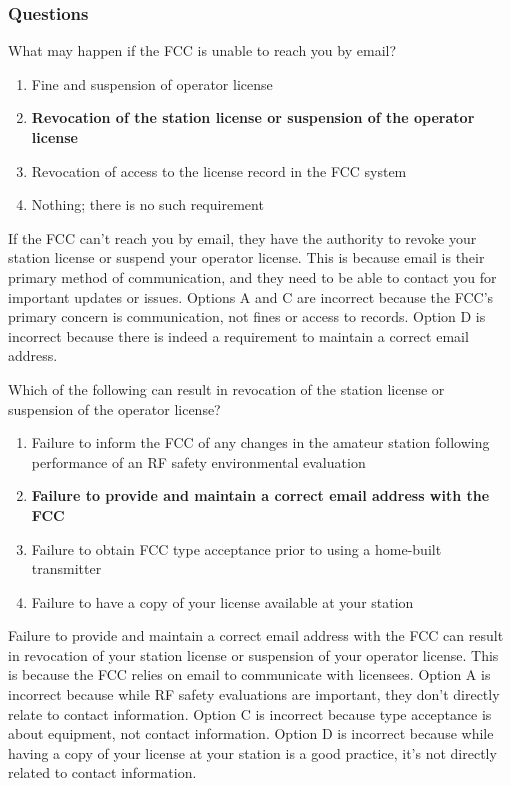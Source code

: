 \subsubsection*{Questions}

\begin{tcolorbox}[colback=gray!10!white,colframe=black!75!black,title={T1C04}]
What may happen if the FCC is unable to reach you by email?
\begin{enumerate}[label=\Alph*),noitemsep]
    \item Fine and suspension of operator license
    \item \textbf{Revocation of the station license or suspension of the operator license}
    \item Revocation of access to the license record in the FCC system
    \item Nothing; there is no such requirement
\end{enumerate}
\end{tcolorbox}

If the FCC can’t reach you by email, they have the authority to revoke your station license or suspend your operator license. This is because email is their primary method of communication, and they need to be able to contact you for important updates or issues. Options A and C are incorrect because the FCC’s primary concern is communication, not fines or access to records. Option D is incorrect because there is indeed a requirement to maintain a correct email address.

\begin{tcolorbox}[colback=gray!10!white,colframe=black!75!black,title={T1C07}]
Which of the following can result in revocation of the station license or suspension of the operator license?
\begin{enumerate}[label=\Alph*),noitemsep]
    \item Failure to inform the FCC of any changes in the amateur station following performance of an RF safety environmental evaluation
    \item \textbf{Failure to provide and maintain a correct email address with the FCC}
    \item Failure to obtain FCC type acceptance prior to using a home-built transmitter
    \item Failure to have a copy of your license available at your station
\end{enumerate}
\end{tcolorbox}

Failure to provide and maintain a correct email address with the FCC can result in revocation of your station license or suspension of your operator license. This is because the FCC relies on email to communicate with licensees. Option A is incorrect because while RF safety evaluations are important, they don’t directly relate to contact information. Option C is incorrect because type acceptance is about equipment, not contact information. Option D is incorrect because while having a copy of your license at your station is a good practice, it’s not directly related to contact information.
